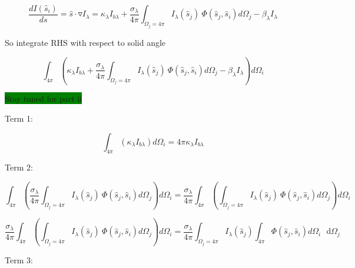\documentclass[12pt]{article}
\renewcommand{\_}{\kern-1.5pt\textunderscore\kern-1.5pt}
\begin{document}
 \[ \frac{dI \left( \hat{s}_{i} \right) }{ds}=\hat{s} \cdot \triangledown I_{ \lambda }= \kappa _{ \lambda }I_{b \lambda }+\frac{ \sigma _{ \lambda }}{4 \pi } \int _{ \Omega _{j}=4 \pi }^{}I_{ \lambda } \left( \hat{s}_{j} \right) ~ \Phi  \left( \hat{s}_{j},\hat{s}_{i} \right) d \Omega _{j}- \beta _{ \lambda }I_{ \lambda } \] \par

So integrate RHS with respect to solid angle\par

 \[  \int _{4 \pi }^{} \left(  \kappa _{ \lambda }I_{b \lambda }+\frac{ \sigma _{ \lambda }}{4 \pi } \int _{ \Omega _{j}=4 \pi }^{}I_{ \lambda } \left( \hat{s}_{j} \right) ~ \Phi  \left( \hat{s}_{j},\hat{s}_{i} \right) d \Omega _{j}- \beta _{ \lambda }I_{ \lambda } \right) d \Omega _{i} \] \par

\colorbox{Green}{Stay tuned for part ii}\par

Term 1:\par

 \[  \int _{4 \pi }^{} \left(  \kappa _{ \lambda }I_{b \lambda } \right) d \Omega _{i}=4 \pi  \kappa _{ \lambda }I_{b \lambda } \] \par

Term 2:\par

 \[  \int _{4 \pi }^{} \left( \frac{ \sigma _{ \lambda }}{4 \pi } \int _{ \Omega _{j}=4 \pi }^{}I_{ \lambda } \left( \hat{s}_{j} \right) ~ \Phi  \left( \hat{s}_{j},\hat{s}_{i} \right) d \Omega _{j} \right) d \Omega _{i}=\frac{ \sigma _{ \lambda }}{4 \pi } \int _{4 \pi }^{} \left(  \int _{ \Omega _{j}=4 \pi }^{}I_{ \lambda } \left( \hat{s}_{j} \right) ~ \Phi  \left( \hat{s}_{j},\hat{s}_{i} \right) d \Omega _{j} \right) d \Omega _{i} \] \par

 \[ \frac{ \sigma _{ \lambda }}{4 \pi } \int _{4 \pi }^{} \left(  \int _{ \Omega _{j}=4 \pi }^{}I_{ \lambda } \left( \hat{s}_{j} \right) ~ \Phi  \left( \hat{s}_{j},\hat{s}_{i} \right) d \Omega _{j} \right) d \Omega _{i}=\frac{ \sigma _{ \lambda }}{4 \pi } \int _{ \Omega _{j}=4 \pi }^{}I_{ \lambda } \left( \hat{s}_{j} \right)  \int _{4 \pi }^{} \Phi  \left( \hat{s}_{j},\hat{s}_{i} \right) d \Omega _{i}\text{~ d} \Omega _{j} \] \par


\vspace{\baselineskip}
Term 3:\par
\end{document}
